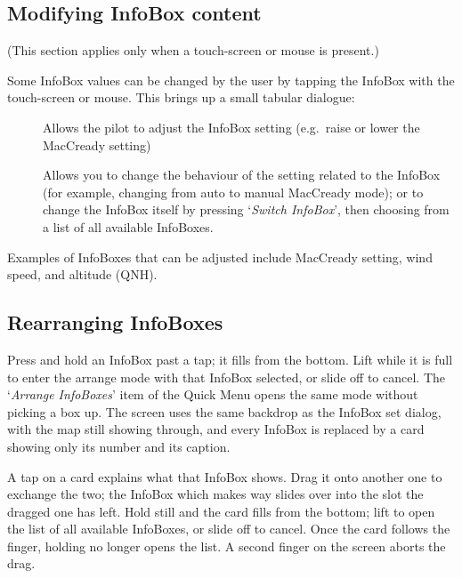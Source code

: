 \blink{}\blink{}\blink{}\blink{}


\subsection*{Modifying InfoBox content}

(This section applies only when a touch-screen or mouse is present.)

Some InfoBox values can be changed by the user by tapping the
InfoBox with the touch-screen or mouse.  This brings up a small tabular dialogue:

\begin{description}
\item[]  
  Allows the pilot to adjust the InfoBox setting (e.g.\ raise or lower the
  MacCready setting)

\item[]
  Allows you to change the behaviour of the setting related to the InfoBox 
  (for example, changing from auto to manual MacCready mode); or 
  to change the InfoBox itself by pressing `\emph{Switch InfoBox}', then 
  choosing from a list of all available InfoBoxes.

\end{description}

Examples of InfoBoxes that can
be adjusted include MacCready setting, wind speed, and altitude (QNH).


\subsection*{Rearranging InfoBoxes}\label{sec:arrange_infoboxes}

Press and hold an InfoBox past a tap; it fills from the bottom.
Lift while it is full to enter the arrange mode with that InfoBox
selected, or slide off to cancel.  The `\emph{Arrange InfoBoxes}'
item of the Quick Menu opens the same mode without picking a box up.
The screen uses the same backdrop as the InfoBox set dialog, with the
map still showing through, and every InfoBox is replaced by a card
showing only its number and its caption.

A tap on a card explains what that InfoBox shows.  Drag it onto
another one to exchange the two; the InfoBox which makes way slides
over into the slot the dragged one has left.  Hold still and the card fills from the bottom; lift to open the
list of all available InfoBoxes, or slide off to cancel.  Once the
card follows the finger, holding no longer opens the list.  A second
finger on the screen aborts the drag.

